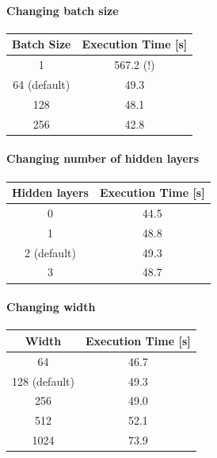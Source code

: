 \documentclass{article}[12pt]
\begin{document}
    \paragraph{Changing batch size}
    \begin{center}
        \begin{tabular}{ | c | c |  }
            \hline
         Batch Size & Execution Time [s] \\ 
         \hline
         1 & 567.2 (!) \\  
         \hline
         64 (default) & 49.3 \\    
         \hline
         128 & 48.1 \\    
         \hline
         256 & 42.8 \\    
         \hline
         
    \end{tabular}
    \end{center}

    \paragraph{Changing number of hidden layers}
    \begin{center}
        \begin{tabular}{ | c | c |  }
            \hline
         Hidden layers & Execution Time [s] \\ 
         \hline
         0 & 44.5 \\  
         \hline
         1 & 48.8 \\    
         \hline
         2 (default) & 49.3 \\    
         \hline
         3 & 48.7 \\    
         \hline
    \end{tabular}
    \end{center}

    \paragraph{Changing width}
    \begin{center}
        \begin{tabular}{ | c | c |  }
            \hline
         Width & Execution Time [s] \\ 
         \hline
         64 & 46.7 \\  
         \hline
         128 (default) & 49.3 \\    
         \hline
         256 & 49.0 \\    
         \hline
         512 & 52.1 \\    
         \hline
         1024 & 73.9 \\    
         \hline
    \end{tabular}
    \end{center}
\end{document}
